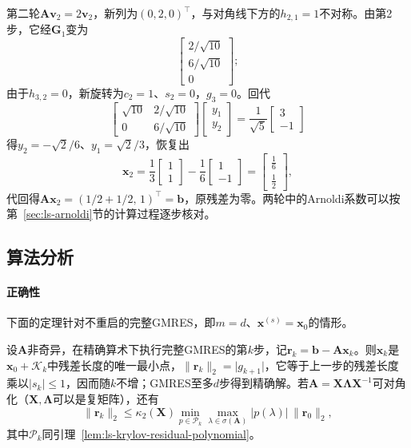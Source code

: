\begin{example}[非对称矩阵上的GMRES]
第二轮$\bm A\bm v_2=2\bm v_2$，新列为$(0,2,0)^\top$，与对角线下方的$h_{2,1}=1$不对称。由第2步，它经$\bm G_1$变为
\[
 \begin{bmatrix}2/\sqrt{10}\\6/\sqrt{10}\\0\end{bmatrix};
\]
由于$h_{3,2}=0$，新旋转为$c_2=1$、$s_2=0$，$g_3=0$。回代
\[
 \begin{bmatrix}\sqrt{10}&2/\sqrt{10}\\0&6/\sqrt{10}\end{bmatrix}\begin{bmatrix}y_1\\y_2\end{bmatrix}=\frac1{\sqrt5}\begin{bmatrix}3\\-1\end{bmatrix}
\]
得$y_2=-\sqrt2/6$、$y_1=\sqrt2/3$，恢复出
\[
 \bm x_2=\frac13\begin{bmatrix}1\\1\end{bmatrix}-\frac16\begin{bmatrix}1\\-1\end{bmatrix}=\begin{bmatrix}\tfrac16\\\tfrac12\end{bmatrix},
\]
代回得$\bm A\bm x_2=(1/2+1/2,\,1)^\top=\bm b$，原残差为零。两轮中的Arnoldi系数可以按第~\ref{sec:ls-arnoldi}节的计算过程逐步核对。
\end{example}

\subsection{算法分析}

\paragraph{正确性}
下面的定理针对不重启的完整GMRES，即$m=d$、$\bm x^{(s)}=\bm x_0$的情形。

\begin{theorem}[GMRES的最小残差性]
\label{thm:ls-gmres-optimality}
设$\bm A$非奇异，在精确算术下执行完整GMRES的第$k$步，记$\bm r_k=\bm b-\bm A\bm x_k$。则$\bm x_k$是$\bm x_0+\mathcal K_k$中残差长度的唯一最小点，$\lVert\bm r_k\rVert_2=\lvert g_{k+1}\rvert$，它等于上一步的残差长度乘以$\lvert s_k\rvert\le1$，因而随$k$不增；GMRES至多$d$步得到精确解。若$\bm A=\bm X\bm\Lambda\bm X^{-1}$可对角化（$\bm X,\bm\Lambda$可以是复矩阵），还有
\begin{equation}
 \lVert\bm r_k\rVert_2\le\kappa_2(\bm X)\min_{p\in\mathcal P_k}\max_{\lambda\in\sigma(\bm A)}\lvert p(\lambda)\rvert\,\lVert\bm r_0\rVert_2,
 \label{eq:ls-gmres-residual-bound}
\end{equation}
其中$\mathcal P_k$同引理~\ref{lem:ls-krylov-residual-polynomial}。
\end{theorem}

